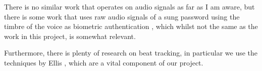 \documentclass[oneside, class=book, crop=false, 12pt]{standalone}
\begin{document}
There is no similar work that operates on audio signals as far as I am aware, but there is some work that uses raw audio signals of a sung password using the timbre of the voice as biometric authentication \cite{prakash16}, which whilst not the same as the work in this project, is somewhat relevant.

Furthermore, there is plenty of research on beat tracking, in particular we use the techniques by Ellis \cite{ellis07}, which are a vital component of our project.


\ifstandalone
  \printbibliography[heading=subbibliography]
\fi
    
\end{document}

